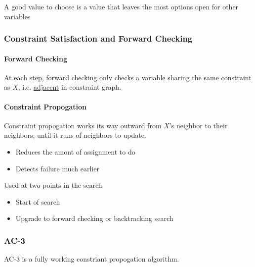       A good value to choose is a value that leaves the most options open
      for other variables

    \subsubsection{Constraint Satisfaction and Forward Checking}

      \paragraph{Forward Checking}
      At each step, forward checking only checks a variable sharing the same
      constraint as $ X $, i.e. \ul{adjacent} in constraint graph.

      \paragraph{Constraint Propogation}
      Constraint propogation works its way outward from $ X $'s neighbor
      to their neighbors, until it runs of neighbors to update.
      \begin{itemize}
        \item Reduces the amont of assignment to do
        \item Detects failure much earlier
      \end{itemize}

      Used at two points in the search

      \begin{itemize}
        \item Start of search
        \item Upgrade to forward checking or backtracking search
      \end{itemize}

    \subsubsection{AC-3}

      AC-3 is a fully working constriant propogation algorithm.

